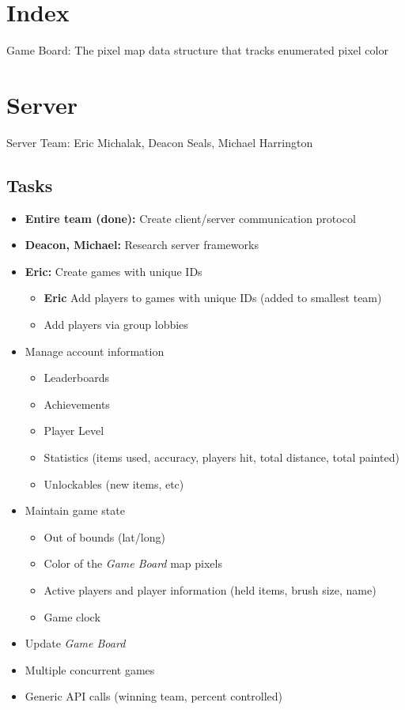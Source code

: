 \documentclass[oneside,12pt]{scrbook}
\begin{document}


\tableofcontents
\clearpage
\chapter{Index}
Game Board: The pixel map data structure that tracks enumerated pixel color

\chapter{Server}
Server Team: Eric Michalak, Deacon Seals, Michael Harrington

\section{Tasks}
\begin{itemize}
    \item \textbf{Entire team (done):} Create client/server communication protocol
    \item \textbf{Deacon, Michael: } Research server frameworks
    \item \textbf{Eric:} Create games with unique IDs
        \begin{itemize}
            \item \textbf{Eric} Add players to games with unique IDs (added to smallest team)
            \item Add players via group lobbies
        \end{itemize}
    \item Manage account information
        \begin{itemize}
            \item Leaderboards
            \item Achievements
            \item Player Level
            \item Statistics (items used, accuracy, players hit, total distance, total painted)
            \item Unlockables (new items, etc)
        \end{itemize}
    \item Maintain game state
        \begin{itemize}
            \item Out of bounds (lat/long)
            \item Color of the \emph{Game Board} map pixels
            \item Active players and player information (held items, brush size, name)
            \item Game clock
        \end{itemize}
    \item Update \emph{Game Board}
    \item Multiple concurrent games
    \item Generic API calls (winning team, percent controlled)
\end{itemize}
\end{document}
